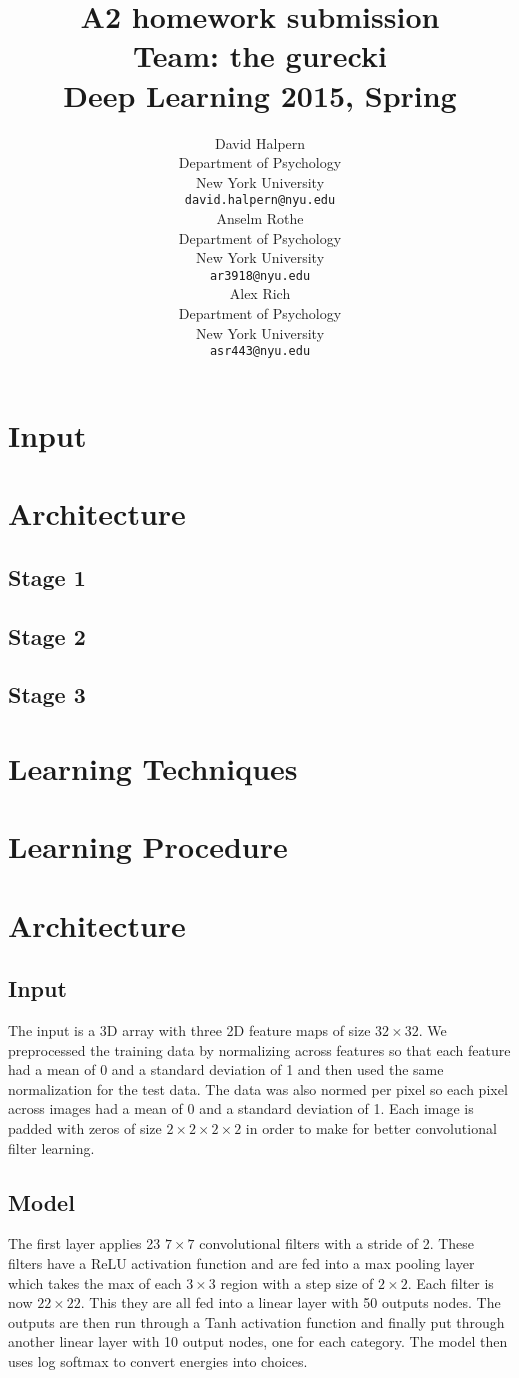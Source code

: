 \documentclass{article} %
\title{A2 homework submission \\ Team: the gurecki \\ Deep Learning 2015, Spring}
\author{
David Halpern\\
Department of Psychology\\
New York University\\
\texttt{david.halpern@nyu.edu} \\
\And
Anselm Rothe\\
Department of Psychology\\
New York University\\
\texttt{ar3918@nyu.edu} \\
\AND
Alex Rich\\
Department of Psychology\\
New York University\\
\texttt{asr443@nyu.edu} \\
}
\begin{document}
\maketitle

\section{Input}
\section{Architecture}
\subsection{Stage 1}
\subsection{Stage 2}
\subsection{Stage 3}
\section{Learning Techniques}
\section{Learning Procedure}

\section{Architecture}

\subsection{Input}

The input is a 3D array with three 2D feature maps of size $32 \times 32$. We preprocessed the training data 
by normalizing across features so that each feature had a mean of 0 and a standard deviation of 1 and then
used the same normalization for the test data. The data was also normed per pixel so each pixel across images
had a mean of 0 and a standard deviation of 1. Each image is padded with zeros of size $2\times2\times2\times2$
in order to make for better convolutional filter learning.

\subsection{Model}
The first layer applies 23 $7\times7$ convolutional filters with a stride of 2.  These 
filters have a ReLU activation function and are fed into a max pooling layer which 
takes the max of each $3\times3$ region with a step size of $2\times2$. Each filter
is now $22\times22$. This they are all fed into a linear layer with 50 outputs nodes.
The outputs are then run through a Tanh activation function and finally put through 
another linear layer with 10 output nodes, one for each category. The model then
uses log softmax to convert energies into choices.
\end{document}
